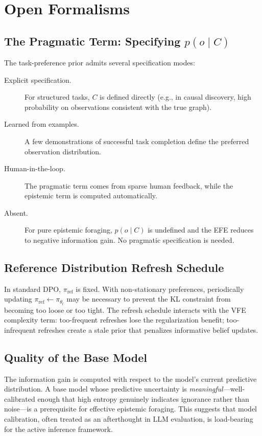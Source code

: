 \documentclass[11pt]{article}
\begin{document}
\section{Open Formalisms}
\label{sec:open}

\subsection{The Pragmatic Term: Specifying $p(o \mid C)$}

The task-preference prior admits several specification modes:

\begin{description}
    \item[Explicit specification.] For structured tasks, $C$ is defined directly (e.g., in causal discovery, high probability on observations consistent with the true graph).
    \item[Learned from examples.] A few demonstrations of successful task completion define the preferred observation distribution.
    \item[Human-in-the-loop.] The pragmatic term comes from sparse human feedback, while the epistemic term is computed automatically.
    \item[Absent.] For pure epistemic foraging, $p(o \mid C)$ is undefined and the EFE reduces to negative information gain. No pragmatic specification is needed.
\end{description}

\subsection{Reference Distribution Refresh Schedule}

In standard DPO, $\pi_{\mathrm{ref}}$ is fixed. With non-stationary preferences, periodically updating $\pi_{\mathrm{ref}} \leftarrow \pi_{\theta_t}$ may be necessary to prevent the KL constraint from becoming too loose or too tight. The refresh schedule interacts with the VFE complexity term: too-frequent refreshes lose the regularization benefit; too-infrequent refreshes create a stale prior that penalizes informative belief updates.

\subsection{Quality of the Base Model}

The information gain is computed with respect to the model's current predictive distribution. A base model whose predictive uncertainty is \emph{meaningful}---well-calibrated enough that high entropy genuinely indicates ignorance rather than noise---is a prerequisite for effective epistemic foraging. This suggests that model calibration, often treated as an afterthought in LLM evaluation, is load-bearing for the active inference framework.
\end{document}
